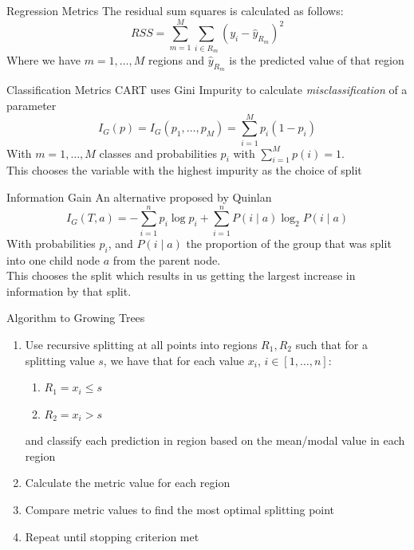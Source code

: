 \documentclass[12pt]{beamer}
\begin{document}
\begin{frame}{Regression Metrics}
    The residual sum squares is calculated as follows:
    \begin{equation}
    RSS = \sum_{m=1}^{M} \sum_{i \in R_m} (y_i - \hat{y}_{R_m})^2
 \end{equation}
 Where we have $m = 1,\dots,M$ regions and $\hat{y}_{R_m}$ is the predicted value of that region
\end{frame}

\begin{frame}{Classification Metrics}
CART uses Gini Impurity to calculate \textit{misclassification} of a parameter
\begin{equation}
    I_G (p) = I_G (p_1, \dots, p_M) = \sum_{i=1}^{M} p_i(1-p_i)
\end{equation}
With $m = 1,\dots,M$ classes and probabilities $p_i$ with $\sum_{i=1}^{M} p(i) = 1$.
\medskip\\
This chooses the variable with the highest impurity as the choice of split
\end{frame}

\begin{frame}{Information Gain}
    An alternative proposed by Quinlan \cite{Quinlan}
    \[  I_G(T,a) = -\sum_{i=1}^{n} p_i \log p_i 
    + \sum_{i=1}^{n} P(i \mid a) \log_2 P(i \mid a) \]
    With probabilities $p_i$, and $P(i \mid a)$ the proportion of the group that was split into one child node $a$ from the parent node.
    \medskip\\
    This chooses the split which results in us getting the largest increase in information by that split. 
\end{frame}

\begin{frame}{Algorithm to Growing Trees}
    \begin{enumerate}
     \item Use recursive splitting at all points into regions $R_1, R_2$ such that for a splitting value $s$, we have that for each value $x_i$, $i \in [1, \dots, n]$:
     \begin{enumerate}
         \item $R_1 = x_i \leq s$
         \item $R_2 = x_i > s$
     \end{enumerate}
     and classify each prediction in region based on the mean/modal value in each region
     
     \item Calculate the metric value for each region
     
     \item Compare metric values to find the most optimal splitting point
     
     \item Repeat until stopping criterion met
 \end{enumerate}
\end{frame}
\end{document}
